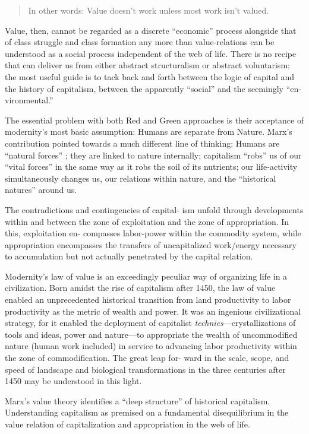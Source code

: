 \documentclass[
]{book}
\begin{document}
\begin{quote}
In other words: Value doesn't work unless most work isn't valued.
\end{quote}

Value, then, cannot be regarded as a discrete ``economic'' process
alongside that of class struggle and class formation any more than
value-relations can be understood as a social process independent of
the web of life. There is no recipe that can deliver us from either
abstract structuralism or abstract voluntarism; the most useful guide
is to tack back and forth between the logic of capital and the history
of capitalism, between the apparently ``social'' and the seemingly ``en-
vironmental.''

The essential problem with both Red
and Green approaches is their acceptance of modernity's most basic
assumption: Humans are separate from Nature.
Marx's contribution pointed towards a much different line of thinking:
Humans are ``natural forces'' ; they are linked to nature
internally; capitalism ``robs'' us of our ``vital forces'' in the same
way as it robs the soil of its nutrients; our life-activity
simultaneously changes us, our relations within nature, and the ``historical
natures'' around us.

The contradictions and contingencies of capital-
ism unfold through developments within and between the zone of
exploitation and the zone of appropriation. In this, exploitation en-
compasses labor-power within the commodity system, while appropriation
encompasses the transfers of uncapitalized work/energy necessary
to accumulation but not actually penetrated by the capital
relation.

Modernity's law of value is an exceedingly peculiar way of organizing
life in a civilization. Born amidst the rise of capitalism after
1450, the law of value enabled an unprecedented historical transition
from land productivity to labor productivity as the metric of wealth
and power. It was an ingenious civilizational strategy, for it enabled
the deployment of capitalist \emph{technics}---crystallizations of tools and
ideas, power and nature---to appropriate the wealth of uncommodified
nature (human work included) in service to advancing labor
productivity within the zone of commodification. The great leap for-
ward in the scale, scope, and speed of landscape and biological
transformations in the three centuries after 1450 may be understood in
this light.

Marx's value theory identifies a ``deep structure'' of historical capitalism.
Understanding capitalism as premised on a fundamental
disequilibrium in the value relation of capitalization and appropriation
in the web of life.
\end{document}
